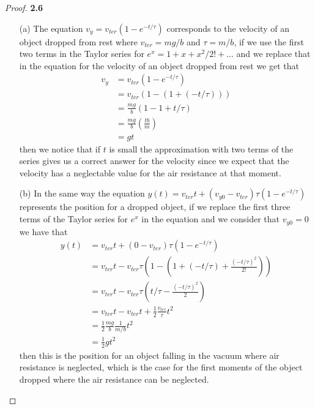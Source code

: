 \documentclass[11pt]{article}
\theoremstyle{definition}
\begin{document}
	\begin{proof}{\textbf{2.6}}
        \begin{itemize}
            \item[(a)] The equation $v_y = v_{ter}(1 - e^{-t/\tau})$ corresponds
            to the velocity of an object dropped from rest where $v_{ter} = mg/b$
            and $\tau = m/b$, if we use the first two terms in the Taylor series
            for $e^x = 1 + x + x^2/2! + ...$ and we replace that in the equation
            for the velocity of an object dropped from rest we get that
            \begin{align*}
                v_y &= v_{ter}(1 - e^{-t/\tau}) \\
                    &= v_{ter}(1 - (1 + (-t/\tau)))\\
                    &= \frac{mg}{b}(1 - 1 + t/\tau)\\
                    &= \frac{mg}{b}\left(\frac{tb}{m}\right)\\
                    &= gt
            \end{align*}
            then we notice that if $t$ is small the approximation with two terms
            of the series gives us a correct answer for the velocity since we
            expect that the velocity has a neglectable value for the air
            resistance at that moment.
            \item[(b)] In the same way the equation
            $y(t) = v_{ter}t + (v_{y0} - v_{ter})\tau(1 - e^{-t/\tau})$
            represents the position for a dropped object, if we replace the
            first three terms of the Taylor series for $e^x$ in the equation
            and we consider that $v_{y0} = 0$ we have that
            \begin{align*}
                y(t) &= v_{ter}t + (0 - v_{ter})\tau(1 - e^{-t/\tau})\\
                     &= v_{ter}t - v_{ter}\tau(1 - (1 + (-t/\tau) + \frac{(-t/\tau)^2}{2!}))\\
                     &= v_{ter}t - v_{ter}\tau(t/\tau - \frac{(-t/\tau)^2}{2})\\
                     &= v_{ter}t - v_{ter}t + \frac{1}{2}\frac{v_{ter}}{\tau}t^2\\
                     &= \frac{1}{2}\frac{mg}{b}\frac{1}{m/b}t^2\\
                     &= \frac{1}{2}gt^2
            \end{align*}
            then this is the position for an object falling in the vacuum where
            air resistance is neglected, which is the case for the first moments
            of the object dropped where the air resistance can be neglected.
        \end{itemize}
    \end{proof}
\end{document}
